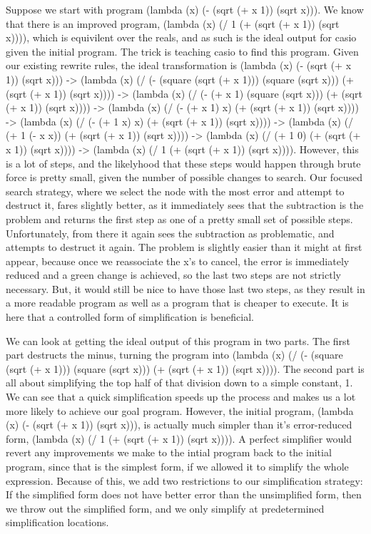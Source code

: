 \documentclass{article}
\begin{document}
Suppose we start with program (lambda (x) (- (sqrt (+ x 1)) (sqrt x))). 
We know that there is an improved program, 
(lambda (x) (/ 1 (+ (sqrt (+ x 1)) (sqrt x)))), 
which is equivilent over the reals, 
and as such is the ideal output 
for casio given the initial program. 
The trick is teaching casio 
to find this program. 
Given our existing rewrite rules, 
the ideal transformation is 
(lambda (x) (- (sqrt (+ x 1)) (sqrt x))) -> 
(lambda (x) (/ (- (square (sqrt (+ x 1))) (square (sqrt x))) (+ (sqrt (+ x 1)) (sqrt x)))) -> 
(lambda (x) (/ (- (+ x 1) (square (sqrt x))) (+ (sqrt (+ x 1)) (sqrt x)))) -> 
(lambda (x) (/ (- (+ x 1) x) (+ (sqrt (+ x 1)) (sqrt x)))) -> 
(lambda (x) (/ (- (+ 1 x) x) (+ (sqrt (+ x 1)) (sqrt x)))) -> 
(lambda (x) (/ (+ 1 (- x x)) (+ (sqrt (+ x 1)) (sqrt x)))) -> 
(lambda (x) (/ (+ 1 0) (+ (sqrt (+ x 1)) (sqrt x)))) -> 
(lambda (x) (/ 1 (+ (sqrt (+ x 1)) (sqrt x)))). 
However, this is a lot of steps, 
and the likelyhood that these steps 
would happen through brute force 
is pretty small, 
given the number of possible 
changes to search. 
Our focused search strategy, 
where we select the node 
with the most error 
and attempt to destruct it, 
fares slightly better, 
as it immediately sees that the subtraction is the problem 
and returns the first step as one 
of a pretty small set of possible steps. 
Unfortunately, 
from there it again sees the subtraction as problematic, 
and attempts to destruct it again. 
The problem is slightly easier than it might at first appear, 
because once we reassociate the x's to cancel, 
the error is immediately reduced 
and a green change is achieved, 
so the last two steps are not strictly necessary. 
But, it would still be nice to have those last two steps, 
as they result in a more readable program 
as well as a program that is cheaper to execute. 
It is here that a controlled form 
of simplification is beneficial.

We can look at getting the ideal output
 of this program 
in two parts. 
The first part destructs the minus, 
turning the program into 
(lambda (x) (/ (- (square (sqrt (+ x 1))) (square (sqrt x))) (+ (sqrt (+ x 1)) (sqrt x)))). 
The second part is all about simplifying 
the top half of that division 
down to a simple constant, 
1. 
We can see 
that a quick simplification 
speeds up the process 
and makes us a lot more likely 
to achieve our goal program. 
However, the initial program, 
(lambda (x) (- (sqrt (+ x 1)) (sqrt x))), 
is actually much simpler 
than it's error-reduced form, 
(lambda (x) (/ 1 (+ (sqrt (+ x 1)) (sqrt x)))). 
A perfect simplifier 
would revert any improvements we make 
to the intial program 
back to the initial program, 
since that is the simplest form, 
if we allowed it to simplify the whole expression. 
Because of this, 
we add two restrictions 
to our simplification strategy: 
If the simplified form 
does not have better error 
than the unsimplified form, 
then we throw out 
the simplified form, 
and we only simplify 
at predetermined simplification locations.
\end{document}
